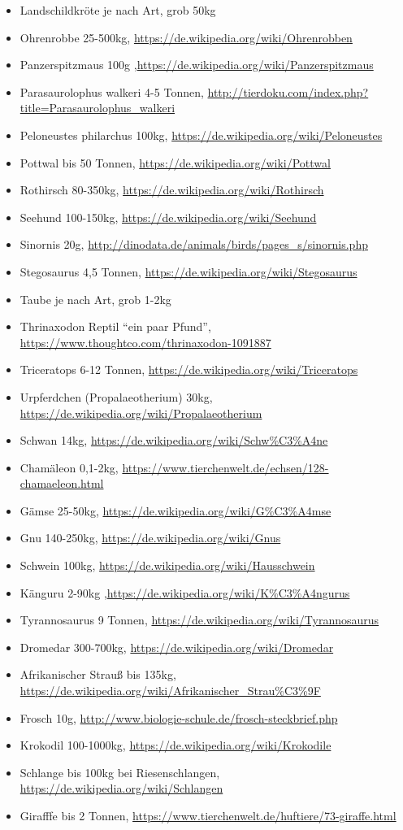 \begin{itemize}
  \item Landschildkröte je nach Art, grob 50kg
  \item Ohrenrobbe 25-500kg, \url{https://de.wikipedia.org/wiki/Ohrenrobben}
  \item Panzerspitzmaus 100g ,\url{https://de.wikipedia.org/wiki/Panzerspitzmaus}
  \item Parasaurolophus walkeri 4-5 Tonnen, \url{http://tierdoku.com/index.php?title=Parasaurolophus_walkeri}
  \item Peloneustes philarchus 100kg, \url{https://de.wikipedia.org/wiki/Peloneustes}
  \item Pottwal bis 50 Tonnen, \url{https://de.wikipedia.org/wiki/Pottwal}
  \item Rothirsch 80-350kg, \url{https://de.wikipedia.org/wiki/Rothirsch}
  \item Seehund 100-150kg, \url{https://de.wikipedia.org/wiki/Seehund}
  \item Sinornis 20g, \url{http://dinodata.de/animals/birds/pages_s/sinornis.php}
  \item Stegosaurus 4,5 Tonnen, \url{https://de.wikipedia.org/wiki/Stegosaurus}
  \item Taube je nach Art, grob 1-2kg
  \item Thrinaxodon Reptil "`ein paar Pfund"', \url{https://www.thoughtco.com/thrinaxodon-1091887}
  \item Triceratops 6-12 Tonnen, \url{https://de.wikipedia.org/wiki/Triceratops}
  \item Urpferdchen (Propalaeotherium) 30kg, \url{https://de.wikipedia.org/wiki/Propalaeotherium}
  \item Schwan 14kg, \url{https://de.wikipedia.org/wiki/Schw\%C3\%A4ne}
  \item Chamäleon 0,1-2kg, \url{https://www.tierchenwelt.de/echsen/128-chamaeleon.html}
  \item Gämse 25-50kg, \url{https://de.wikipedia.org/wiki/G\%C3\%A4mse}
  \item Gnu 140-250kg, \url{https://de.wikipedia.org/wiki/Gnus}
  \item Schwein 100kg, \url{https://de.wikipedia.org/wiki/Hausschwein}
  \item Känguru 2-90kg ,\url{https://de.wikipedia.org/wiki/K\%C3\%A4ngurus}
  \item Tyrannosaurus 9 Tonnen, \url{https://de.wikipedia.org/wiki/Tyrannosaurus}
  \item Dromedar 300-700kg, \url{https://de.wikipedia.org/wiki/Dromedar}
  \item Afrikanischer Strauß bis 135kg, \url{https://de.wikipedia.org/wiki/Afrikanischer_Strau\%C3\%9F}
  \item Frosch 10g, \url{http://www.biologie-schule.de/frosch-steckbrief.php}
  \item Krokodil 100-1000kg, \url{https://de.wikipedia.org/wiki/Krokodile}
  \item Schlange bis 100kg bei Riesenschlangen, \url{https://de.wikipedia.org/wiki/Schlangen}
  \item Girafffe bis 2 Tonnen, \url{https://www.tierchenwelt.de/huftiere/73-giraffe.html}
 \end{itemize}
 

